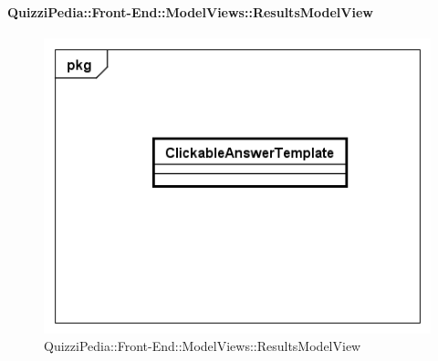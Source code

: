 	\paragraph{QuizziPedia::Front-End::ModelViews::ResultsModelView}
	
	\label{QuizziPedia::Front-End::ModelViews::ResultsModelView}
	
	\begin{figure}[ht]
		\centering
		\includegraphics[scale=0.5,keepaspectratio]{UML/Classi/Front-End/QuizziPedia_Front-end_Templates_ClickableAnswerTemplate.png}
		\caption{QuizziPedia::Front-End::ModelViews::ResultsModelView}
	\end{figure} \FloatBarrier
	
